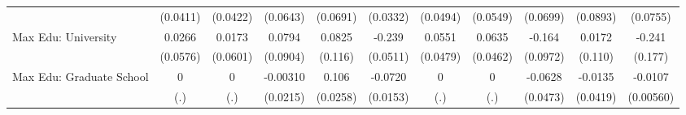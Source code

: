 {\begin{tabular}{l*{10}{c}}
            &    (0.0411)         &    (0.0422)         &    (0.0643)         &    (0.0691)         &    (0.0332)         &    (0.0494)         &    (0.0549)         &    (0.0699)         &    (0.0893)         &    (0.0755)         \\
\addlinespace
Max Edu: University&      0.0266         &      0.0173         &      0.0794         &      0.0825         &      -0.239\sym{***}&      0.0551         &      0.0635         &      -0.164         &      0.0172         &      -0.241         \\
            &    (0.0576)         &    (0.0601)         &    (0.0904)         &     (0.116)         &    (0.0511)         &    (0.0479)         &    (0.0462)         &    (0.0972)         &     (0.110)         &     (0.177)         \\
\addlinespace
Max Edu: Graduate School&           0         &           0         &    -0.00310         &       0.106\sym{***}&     -0.0720\sym{***}&           0         &           0         &     -0.0628         &     -0.0135         &     -0.0107         \\
            &         (.)         &         (.)         &    (0.0215)         &    (0.0258)         &    (0.0153)         &         (.)         &         (.)         &    (0.0473)         &    (0.0419)         &   (0.00560)         \\
\bottomrule
\end{tabular}
}
